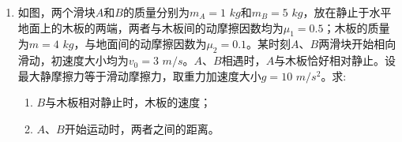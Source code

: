 \begin{enumerate}[leftmargin=0em]
\item 
{}
如图，两个滑块$ A $和$ B $的质量分别为$ m_A=1 $ $ kg $和$ m_B=5 $ $ kg $，放在静止于水平地面上的木板的两端，两者与木板间的动摩擦因数均为$ \mu_1=0.5 $；木板的质量为$ m=4 $ $ kg $，与地面间的动摩擦因数为$ \mu_2=0.1 $。某时刻$ A $、$ B $两滑块开始相向滑动，初速度大小均为$ v_0=3 $ $ m/s $。$ A $、$ B $相遇时，$ A $与木板恰好相对静止。设最大静摩擦力等于滑动摩擦力，取重力加速度大小$ g=10 $ $ m/s^{2} $。求:
\begin{enumerate}
\renewcommand{\labelenumi}{\arabic{enumi}.}
\item
$ B $与木板相对静止时，木板的速度；
\item 
$ A $、$ B $开始运动时，两者之间的距离。

\end{enumerate}
\begin{figure}[h!]
\flushright

\end{figure}












\end{enumerate}

